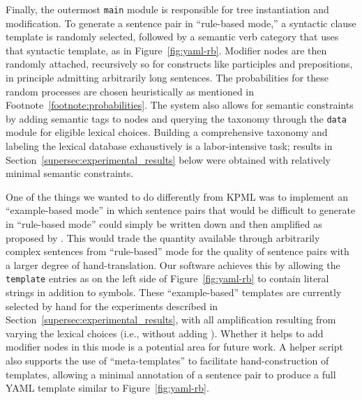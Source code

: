 {Finally, the outermost {\small \tt main} module is responsible for tree instantiation and modification.
To generate a sentence pair in ``rule-based mode,'' a syntactic clause template is randomly selected, followed by a semantic verb category that uses that syntactic template, as in Figure~\ref{fig:yaml-rb}.
Modifier nodes are then randomly attached, recursively so for constructs like participles and prepositions, in principle admitting arbitrarily long sentences.
The probabilities for these random processes are chosen heuristically as mentioned in Footnote~\ref{footnote:probabilities}.
The system also allows for semantic constraints by adding semantic tags to nodes and querying the taxonomy through the {\small \tt data} module for eligible lexical choices. 
Building a comprehensive taxonomy and labeling the lexical database exhaustively is a labor-intensive task; results in Section~\ref{supersec:experimental_results} below were obtained with relatively minimal semantic constraints.


One of the things we wanted to do differently from KPML  was to implement an ``example-based mode'' in which sentence pairs that would be difficult to generate in ``rule-based mode'' could simply be written down and then amplified as proposed by . 
This would trade the quantity available through arbitrarily complex sentences from ``rule-based'' mode for the quality of sentence pairs with a larger degree of hand-translation.
Our software achieves this by allowing the {\small \tt template} entries as on the left side of Figure~\ref{fig:yaml-rb} to contain literal strings in addition to symbols.
These ``example-based'' templates are currently selected by hand for the experiments described in Section~\ref{supersec:experimental_results}, with all amplification resulting from varying the lexical choices (i.e., without adding ).
Whether it helps to add modifier nodes in this mode is a potential area for future work.
A helper script also supports the use of ``meta-templates'' to facilitate hand-construction of templates, allowing a minimal annotation of a sentence pair to produce a full YAML template similar to Figure~\ref{fig:yaml-rb}.

}
